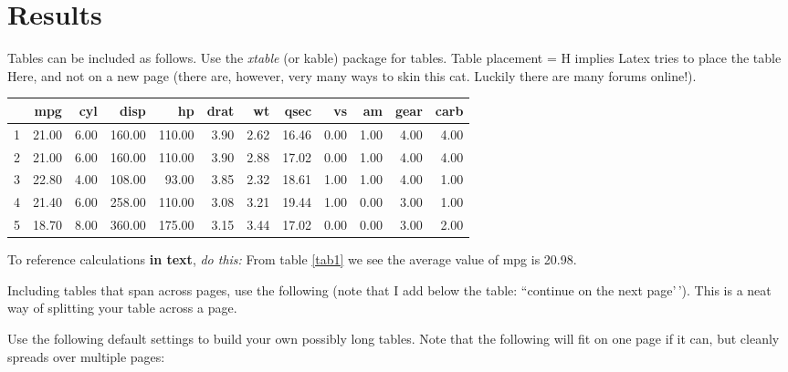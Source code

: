 \documentclass[11pt,preprint, authoryear]{elsarticle}
\let\origtable\table
\let\endorigtable\endtable
\renewenvironment{table}[1][2] {
    \expandafter\origtable\expandafter[H]
} {
    \endorigtable
}
\numberwithin{equation}{section}
\numberwithin{figure}{section}
\numberwithin{table}{section}
\begin{document}
\hypertarget{results}{%
\section{Results}\label{results}}

Tables can be included as follows. Use the \emph{xtable} (or kable)
package for tables. Table placement = H implies Latex tries to place the
table Here, and not on a new page (there are, however, very many ways to
skin this cat. Luckily there are many forums online!).

\begin{table}[H]
\centering
\begin{tabular}{rrrrrrrrrrrr}
  \hline
 & mpg & cyl & disp & hp & drat & wt & qsec & vs & am & gear & carb \\ 
  \hline
1 & 21.00 & 6.00 & 160.00 & 110.00 & 3.90 & 2.62 & 16.46 & 0.00 & 1.00 & 4.00 & 4.00 \\ 
  2 & 21.00 & 6.00 & 160.00 & 110.00 & 3.90 & 2.88 & 17.02 & 0.00 & 1.00 & 4.00 & 4.00 \\ 
  3 & 22.80 & 4.00 & 108.00 & 93.00 & 3.85 & 2.32 & 18.61 & 1.00 & 1.00 & 4.00 & 1.00 \\ 
  4 & 21.40 & 6.00 & 258.00 & 110.00 & 3.08 & 3.21 & 19.44 & 1.00 & 0.00 & 3.00 & 1.00 \\ 
  5 & 18.70 & 8.00 & 360.00 & 175.00 & 3.15 & 3.44 & 17.02 & 0.00 & 0.00 & 3.00 & 2.00 \\ 
   \hline
\end{tabular}
\caption{Short Table Example \label{tab1}} 
\end{table}

To reference calculations \textbf{in text}, \emph{do this:} From table
\ref{tab1} we see the average value of mpg is 20.98.

Including tables that span across pages, use the following (note that I
add below the table: ``continue on the next page'\,'). This is a neat
way of splitting your table across a page.

Use the following default settings to build your own possibly long
tables. Note that the following will fit on one page if it can, but
cleanly spreads over multiple pages:
\end{document}
